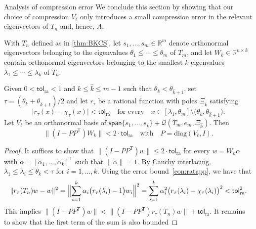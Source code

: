 \documentclass{siamart190516}
\newcommand{\Ttran}{\mathsf{T}}
\newcommand{\tol}{\mathsf{tol}}
\newcommand{\R}{\mathbb{R}}
\providecommand{\spa}[1]{\mathsf{span}\{#1\}}
\providecommand{\diagm}{\mathrm{diag}}
\providecommand{\abs}[1]{\lvert#1\rvert}
\providecommand{\norm}[1]{\lVert#1\rVert}
\providecommand{\Bignorm}[1]{\Bigl\lVert#1\Bigr\rVert}
\begin{document}
\begin{paragraph}{Analysis of compression error}
 We conclude this section by showing that our choice of compression $V_{\ell}$ only introduces a small compression error in the relevant eigenvectors of $T_{n}$ and, hence, $A$.
\begin{theorem}
    \label{thm1}
    With $T_{n}$ defined as in \cref{thm:BKCS}, let
    $s_{1},\dotsc,s_{m} \in \R^m$ denote orthonormal eigenvectors 
    belonging to the eigenvalues  
    $\theta_{1}\leq \dotsb\leq \theta_{m}$ of $T_{m}$, and let 
    $W_k \in \R^{n \times k}$ contain 
    orthonormal eigenvectors belonging to the smallest $k$ eigenvalues $\lambda_1 \le \cdots \le \lambda_k$ of $T_n$.
    
    Given $0<\tol_{\mathrm{ra}}<1$ and $k\leq \widehat{k}\leq m-1$ such that $\theta_k < \theta_{\widehat{k}+1}$, set $\tau=(\theta_{k}+\theta_{\widehat{k}+1})/2$ and let $r_{\tau}$ be a rational function with poles $\Xi_{\widehat{k}}$ satisfying
    \begin{equation}
        \label{con:ratapp}
        \abs{r_{\tau}(x)-\chi_{\tau}(x)} <  \tol_{\mathrm{ra}} \quad \text{for every}\quad x \in \left[\lambda_{1},\theta_{m}\right]\setminus \big(\theta_k,\theta_{\widehat{k}+1}\big).
    \end{equation}
    Let $V_{\ell}$ be an orthonormal basis of $\spa{s_{1},\dotsc,s_{\widehat{k}}}+\mathcal{Q}(T_{m},e_{m},\Xi_{\widehat{k}})$. Then
    \begin{equation*}
        \norm{(I-PP^{\Ttran})W_{k}} < 2 \cdot \tol_{\mathrm{ra}} \quad {\mathrm{with}} \quad P=\diagm(V_{\ell},I).
    \end{equation*}
\end{theorem}
\begin{proof} 
    It suffices to show that $\norm{(I-PP^{\Ttran})w}\leq 2 \cdot \tol_{\mathrm{ra}}$ for every $w = W_{k} \alpha$ with $\alpha = [\alpha_1,\ldots,\alpha_k]^\Ttran$ such that $\norm{\alpha}=1$.
    By Cauchy interlacing, $\lambda_{1}\leq \lambda_{i}\leq \theta_{k} < \tau$ for $i = 1,\ldots, k$.
    Using the error bound~\cref{con:ratapp}, we have that 
    \begin{equation*}
        \norm{r_{\tau}(T_{n})w-w}^{2} =
        \Bignorm{\sum_{i=1}^{k}\alpha_{i}\bigl(r_{\tau}(\lambda_i)-1\bigr) w_{i}}^{2} = \sum_{i=1}^{k} \alpha_{i}^{2}\bigl(r_{\tau}(\lambda_{i})-\chi_{\tau}(\lambda_{i})\bigr)^{2} <  \tol_{\mathrm{ra}}^{2}. 
    \end{equation*} 
    This implies $\norm{(I-PP^{\Ttran})w}< \norm{(I-PP^{\Ttran})r_{\tau}(T_{n})w}+\tol_{\mathrm{ra}}$. It remains to show that the first term of the sum is also bounded 

\end{proof}
\end{paragraph}
\end{document}
